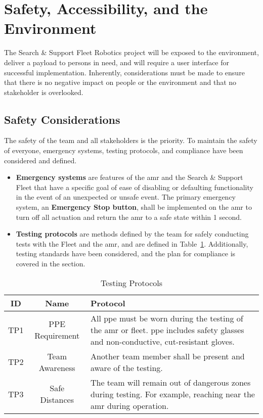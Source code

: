 \section{Safety, Accessibility, and the Environment}
\label{sec:safety_accessibility_environment}

The Search \& Support Fleet Robotics project will be exposed to the environment, deliver a payload to persons in need, and will require a user interface for successful implementation. Inherently, considerations must be made to ensure that there is no negative impact on people or the environment and that no stakeholder is overlooked.

\subsection{Safety Considerations}

The safety of the team and all stakeholders is the priority. To maintain the safety of everyone, emergency systems, testing protocols, and compliance have been considered and defined.

\begin{itemize}
    \item \textbf{Emergency systems} are features of the \gls{amr} and the Search \& Support Fleet that have a specific goal of ease of disabling or defaulting functionality in the event of an unexpected or unsafe event. 
    The primary emergency system, an \textbf{Emergency Stop button}, shall be implemented on the \gls{amr} to turn off all actuation and return the \gls{amr} to a safe state within 1 second.

    \item \textbf{Testing protocols} are methods defined by the team for safely conducting tests with the Fleet and the \gls{amr}, and are defined in Table~\ref{tab:testing_protocols}. 
    Additionally, testing standards have been considered, and the plan for compliance is covered in the  section.
\end{itemize}

\begin{table}[H]
    \centering
    \caption{Testing Protocols}
    \label{tab:testing_protocols}
    \begin{tabular}{|c|c|p{9cm}|}
        \hline
        \textbf{ID} & \textbf{Name} & \textbf{Protocol} \\
        \hline
        TP1 & {PPE Requirement} & All \gls{ppe} must be worn during the testing of the \gls{amr} or \gls{fleet}. \gls{ppe} includes safety glasses and non-conductive, cut-resistant gloves. \\
        \hline
        TP2 & Team Awareness & Another team member shall be present and aware of the testing. \\
        \hline
        TP3 & Safe Distances & The team will remain out of dangerous zones during testing. For example, reaching near the \gls{amr} during operation. \\
        \hline
    \end{tabular}
\end{table}

